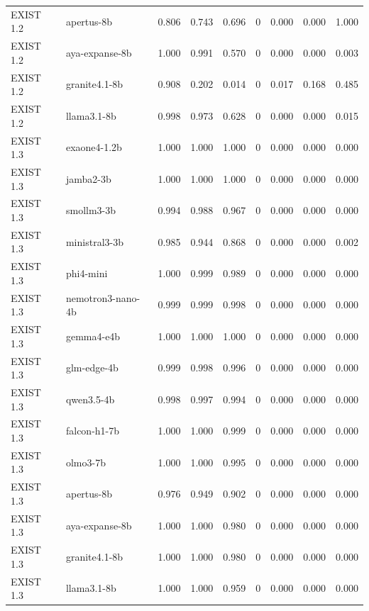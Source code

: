\begin{table}[t]
\begin{tabular}{llrrrrrrr}
EXIST 1.2 & apertus-8b & 0.806 & 0.743 & 0.696 & 0 & 0.000 & 0.000 & 1.000 \\
EXIST 1.2 & aya-expanse-8b & 1.000 & 0.991 & 0.570 & 0 & 0.000 & 0.000 & 0.003 \\
EXIST 1.2 & granite4.1-8b & 0.908 & 0.202 & 0.014 & 0 & 0.017 & 0.168 & 0.485 \\
EXIST 1.2 & llama3.1-8b & 0.998 & 0.973 & 0.628 & 0 & 0.000 & 0.000 & 0.015 \\
EXIST 1.3 & exaone4-1.2b & 1.000 & 1.000 & 1.000 & 0 & 0.000 & 0.000 & 0.000 \\
EXIST 1.3 & jamba2-3b & 1.000 & 1.000 & 1.000 & 0 & 0.000 & 0.000 & 0.000 \\
EXIST 1.3 & smollm3-3b & 0.994 & 0.988 & 0.967 & 0 & 0.000 & 0.000 & 0.000 \\
EXIST 1.3 & ministral3-3b & 0.985 & 0.944 & 0.868 & 0 & 0.000 & 0.000 & 0.002 \\
EXIST 1.3 & phi4-mini & 1.000 & 0.999 & 0.989 & 0 & 0.000 & 0.000 & 0.000 \\
EXIST 1.3 & nemotron3-nano-4b & 0.999 & 0.999 & 0.998 & 0 & 0.000 & 0.000 & 0.000 \\
EXIST 1.3 & gemma4-e4b & 1.000 & 1.000 & 1.000 & 0 & 0.000 & 0.000 & 0.000 \\
EXIST 1.3 & glm-edge-4b & 0.999 & 0.998 & 0.996 & 0 & 0.000 & 0.000 & 0.000 \\
EXIST 1.3 & qwen3.5-4b & 0.998 & 0.997 & 0.994 & 0 & 0.000 & 0.000 & 0.000 \\
EXIST 1.3 & falcon-h1-7b & 1.000 & 1.000 & 0.999 & 0 & 0.000 & 0.000 & 0.000 \\
EXIST 1.3 & olmo3-7b & 1.000 & 1.000 & 0.995 & 0 & 0.000 & 0.000 & 0.000 \\
EXIST 1.3 & apertus-8b & 0.976 & 0.949 & 0.902 & 0 & 0.000 & 0.000 & 0.000 \\
EXIST 1.3 & aya-expanse-8b & 1.000 & 1.000 & 0.980 & 0 & 0.000 & 0.000 & 0.000 \\
EXIST 1.3 & granite4.1-8b & 1.000 & 1.000 & 0.980 & 0 & 0.000 & 0.000 & 0.000 \\
EXIST 1.3 & llama3.1-8b & 1.000 & 1.000 & 0.959 & 0 & 0.000 & 0.000 & 0.000 \\
\bottomrule
\end{tabular}
\end{table}
